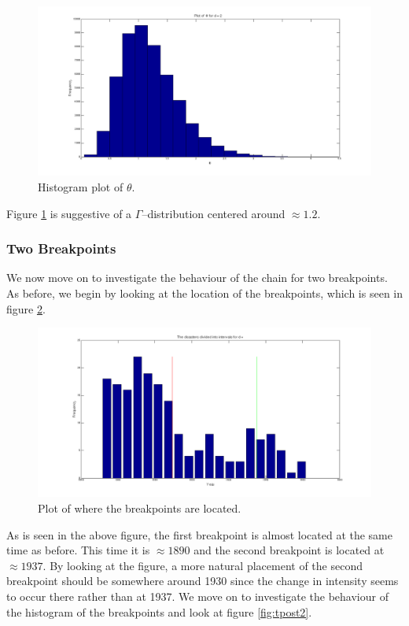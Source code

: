 \begin{figure}[H]
\centering
\includegraphics[scale=0.26]{./Figures/thetapost.png}
\caption{Histogram plot of $\theta$.}
\label{fig:thetapost1}
\end{figure}

Figure \ref{fig:thetapost1} is suggestive of a $\Gamma$--distribution centered around $\approx 1.2$. 

\subsubsection*{Two Breakpoints}

We now move on to investigate the behaviour of the chain for two breakpoints. As before, we begin by looking at the location of the breakpoints, which is seen in figure \ref{fig:bp2}.

\begin{figure}[H]
\centering
\includegraphics[scale=0.26]{./Figures/bp2.png}
\caption{Plot of where the breakpoints are located.}
\label{fig:bp2}
\end{figure}

As is seen in the above figure, the first breakpoint is almost located at the same time as before. This time it is $\approx 1890$ and the second breakpoint is located at $\approx 1937$. By looking at the figure, a more natural placement of the second breakpoint should be somewhere around 1930 since the change in intensity seems to occur there rather than at 1937. We move on to investigate the behaviour of the histogram of the breakpoints and look at figure \ref{fig:tpost2}.

